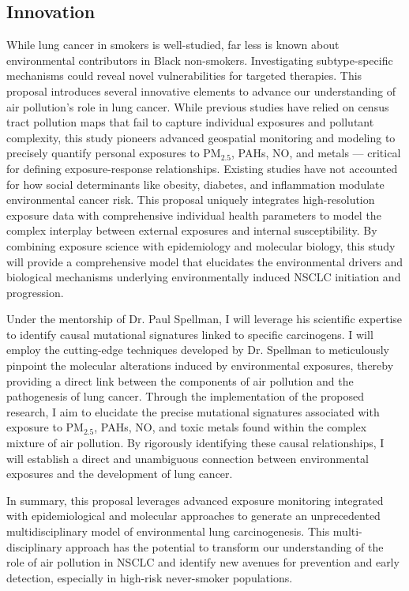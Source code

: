 \subsection{Innovation}

While lung cancer in smokers is well-studied, far less is known about environmental contributors in Black non-smokers. 
Investigating subtype-specific mechanisms could reveal novel vulnerabilities for targeted therapies. %
This proposal introduces several innovative elements to advance our understanding of air pollution's role in lung cancer. 
While previous studies have relied on census tract pollution maps that fail to capture individual exposures and pollutant complexity, 
this study pioneers advanced geospatial monitoring and modeling to precisely quantify personal exposures to PM$_{2.5}$, PAHs, NO, 
and metals — critical for defining exposure-response relationships. 
Existing studies have not accounted for how social determinants like obesity, diabetes, and inflammation modulate environmental cancer risk. 
This proposal uniquely integrates high-resolution exposure data with comprehensive individual health parameters 
to model the complex interplay between external exposures and internal susceptibility. 
By combining exposure science with epidemiology and molecular biology, 
this study will provide a comprehensive model that elucidates the environmental drivers and biological mechanisms underlying 
environmentally induced NSCLC initiation and progression. 

Under the mentorship of Dr. Paul Spellman, I will leverage his scientific expertise to identify causal mutational signatures linked to specific carcinogens. 
I will employ the cutting-edge techniques developed by Dr. Spellman to meticulously pinpoint the molecular alterations induced by environmental exposures, 
thereby providing a direct link between the components of air pollution and the pathogenesis of lung cancer. 
Through the implementation of the proposed research, I aim to elucidate the precise mutational signatures associated with exposure to 
PM$_{2.5}$, PAHs, NO, and toxic metals found within the complex mixture of air pollution. 
By rigorously identifying these causal relationships, I will establish a direct and unambiguous 
connection between environmental exposures and the development of lung cancer.

In summary, this proposal leverages advanced exposure monitoring integrated with epidemiological and molecular approaches 
to generate an unprecedented multidisciplinary model of environmental lung carcinogenesis. 
This multi-disciplinary approach has the potential to transform our understanding of the role of air pollution in NSCLC 
and identify new avenues for prevention and early detection, especially in high-risk never-smoker populations.

